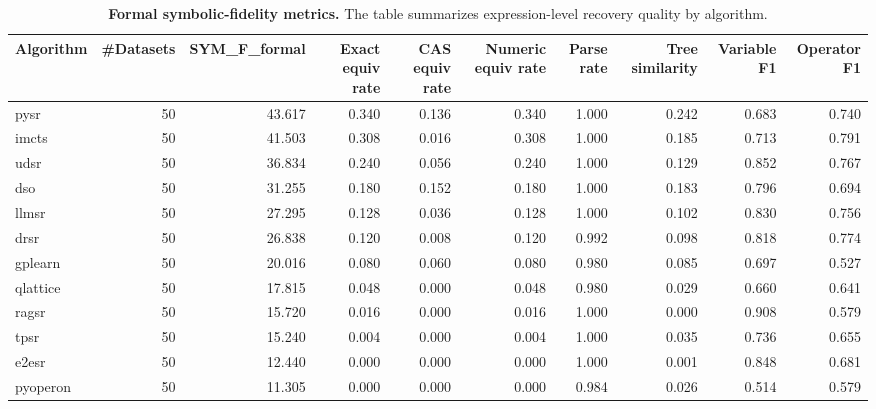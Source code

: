 \begin{table}
\caption{\textbf{Formal symbolic-fidelity metrics.} The table summarizes expression-level recovery quality by algorithm.}
\label{tab:table12_symbolic_fidelity_summary}
\begin{tabular}{lrrrrrrrrr}
\toprule
\textbf{Algorithm} & \textbf{\#Datasets} & \textbf{SYM\_F\_formal} & \textbf{Exact equiv rate} & \textbf{CAS equiv rate} & \textbf{Numeric equiv rate} & \textbf{Parse rate} & \textbf{Tree similarity} & \textbf{Variable F1} & \textbf{Operator F1} \\
\midrule
pysr & 50 & 43.617 & 0.340 & 0.136 & 0.340 & 1.000 & 0.242 & 0.683 & 0.740 \\
imcts & 50 & 41.503 & 0.308 & 0.016 & 0.308 & 1.000 & 0.185 & 0.713 & 0.791 \\
udsr & 50 & 36.834 & 0.240 & 0.056 & 0.240 & 1.000 & 0.129 & 0.852 & 0.767 \\
dso & 50 & 31.255 & 0.180 & 0.152 & 0.180 & 1.000 & 0.183 & 0.796 & 0.694 \\
llmsr & 50 & 27.295 & 0.128 & 0.036 & 0.128 & 1.000 & 0.102 & 0.830 & 0.756 \\
drsr & 50 & 26.838 & 0.120 & 0.008 & 0.120 & 0.992 & 0.098 & 0.818 & 0.774 \\
gplearn & 50 & 20.016 & 0.080 & 0.060 & 0.080 & 0.980 & 0.085 & 0.697 & 0.527 \\
qlattice & 50 & 17.815 & 0.048 & 0.000 & 0.048 & 0.980 & 0.029 & 0.660 & 0.641 \\
ragsr & 50 & 15.720 & 0.016 & 0.000 & 0.016 & 1.000 & 0.000 & 0.908 & 0.579 \\
tpsr & 50 & 15.240 & 0.004 & 0.000 & 0.004 & 1.000 & 0.035 & 0.736 & 0.655 \\
e2esr & 50 & 12.440 & 0.000 & 0.000 & 0.000 & 1.000 & 0.001 & 0.848 & 0.681 \\
pyoperon & 50 & 11.305 & 0.000 & 0.000 & 0.000 & 0.984 & 0.026 & 0.514 & 0.579 \\
\bottomrule
\end{tabular}
\end{table}
